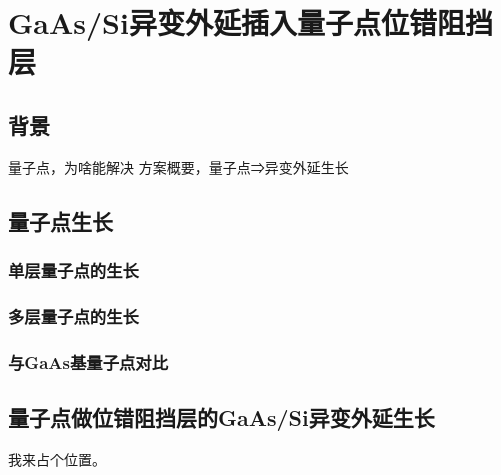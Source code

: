 % 

\chapter{GaAs/Si异变外延插入量子点位错阻挡层}
\section{背景}
量子点，为啥能解决
方案概要，量子点⇒异变外延生长

\section{量子点生长}

\subsection{单层量子点的生长}

\subsection{多层量子点的生长}

\subsection{与GaAs基量子点对比}

\section{量子点做位错阻挡层的GaAs/Si异变外延生长}
我来占个位置。\cite{BUPT_Thesis_Format_2004}



\ifx\usechapbib\empty


\fi

